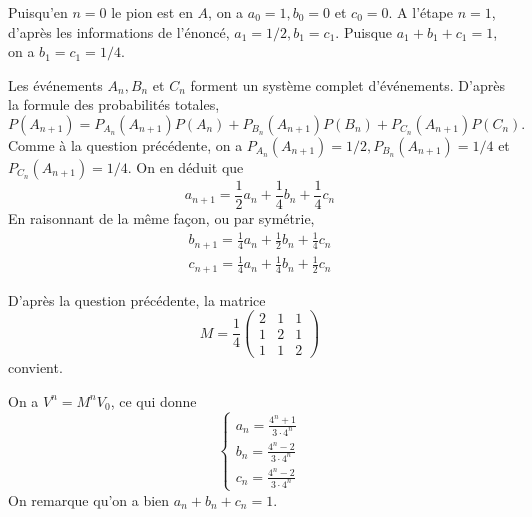 \documentclass[a4paper, 11pt,reqno]{article}
\begin{document}
\begin{correction}
\item  Puisqu'en $n=0$ le pion est en $A$, on a $a_{0}=1, b_{0}=0$ et $c_{0}=0 .$ A l'étape $n=1$, d'après les informations de l'énoncé, $a_{1}=1 / 2, b_{1}=c_{1}$. Puisque $a_{1}+b_{1}+c_{1}=1$, on a $b_{1}=c_{1}=1 / 4$.
\item  Les événements $A_{n}, B_{n}$ et $C_{n}$ forment un système complet d'événements. D'après la formule des probabilités totales,
$$
P\left(A_{n+1}\right)=P_{A_{n}}\left(A_{n+1}\right) P\left(A_{n}\right)+P_{B_{n}}\left(A_{n+1}\right) P\left(B_{n}\right)+P_{C_{n}}\left(A_{n+1}\right) P\left(C_{n}\right) .
$$
Comme à la question précédente, on a $P_{A_{n}}\left(A_{n+1}\right)=1 / 2, P_{B_{n}}\left(A_{n+1}\right)=1 / 4$ et $P_{C_{n}}\left(A_{n+1}\right)=1 / 4$. On en déduit que
$$
a_{n+1}=\frac{1}{2} a_{n}+\frac{1}{4} b_{n}+\frac{1}{4} c_{n}
$$
En raisonnant de la même façon, ou par symétrie,
$$
\begin{gathered}
b_{n+1}=\frac{1}{4} a_{n}+\frac{1}{2} b_{n}+\frac{1}{4} c_{n} \\
c_{n+1}=\frac{1}{4} a_{n}+\frac{1}{4} b_{n}+\frac{1}{2} c_{n}
\end{gathered}
$$
\item  D'après la question précédente, la matrice
$$
M=\frac{1}{4}\left(\begin{array}{lll}
2 & 1 & 1 \\
1 & 2 & 1 \\
1 & 1 & 2
\end{array}\right)
$$
convient.
\item  On a $V^{n}=M^{n} V_{0}$, ce qui donne
$$
\left\{\begin{array}{l}
a_{n}=\frac{4^{n}+1}{3 \cdot 4^{n}} \\
b_{n}=\frac{4^{n}-2}{3 \cdot 4^{n}} \\
c_{n}=\frac{4^{n}-2}{3 \cdot 4^{n}}
\end{array}\right.
$$
On remarque qu'on a bien $a_{n}+b_{n}+c_{n}=1$.

\end{correction}
\end{document}

